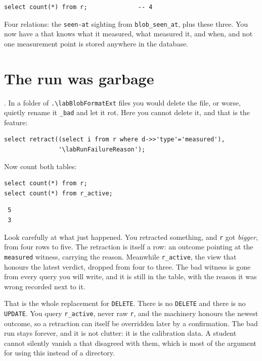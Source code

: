 \begin{verbatim}
select count(*) from r;              -- 4
\end{verbatim}

Four relations: the \verb|seen-at| sighting from \verb|blob_seen_at|, plus these three. You now have a \labRun{} that knows what it measured, what measured it, and when, and not one measurement point is stored anywhere in the database.

\section{The run was garbage}

\labRunFailure. In a folder of \verb|.\labBlobFormatExt| files you would delete the file, or worse, quietly rename it \verb|_bad| and let it rot. Here you cannot delete it, and that is the feature:

\begin{verbatim}
select retract((select i from r where d->>'type'='measured'),
               '\labRunFailureReason');
\end{verbatim}

Now count both tables:

\begin{verbatim}
select count(*) from r;
select count(*) from r_active;
\end{verbatim}

\begin{verbatim}
 5
 3
\end{verbatim}

Look carefully at what just happened. You retracted something, and \verb|r| got \emph{bigger}, from four rows to five. The retraction is itself a row: an outcome pointing at the \verb|measured| witness, carrying the reason. Meanwhile \verb|r_active|, the view that honours the latest verdict, dropped from four to three. The bad witness is gone from every query you will write, and it is still in the table, with the reason it was wrong recorded next to it.

That is the whole replacement for \verb|DELETE|. There is no \verb|DELETE| and there is no \verb|UPDATE|. You query \verb|r_active|, never raw \verb|r|, and the machinery honours the newest outcome, so a retraction can itself be overridden later by a confirmation. The bad run stays forever, and it is not clutter: it is the calibration data. A student cannot silently vanish a \labRun{} that disagreed with them, which is most of the argument for using this instead of a directory.

